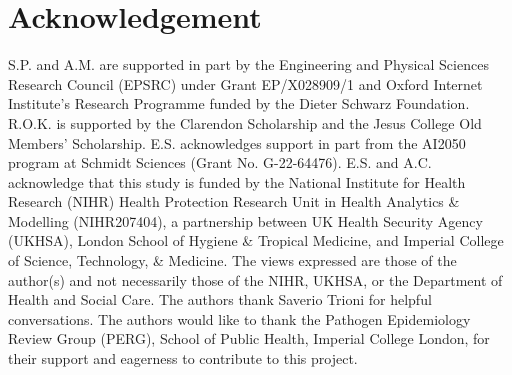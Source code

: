 \clearpage

\section*{Acknowledgement}
S.P. and A.M. are supported in part by the Engineering and Physical Sciences Research Council (EPSRC) under Grant EP/X028909/1 and Oxford Internet Institute’s Research Programme funded by the Dieter Schwarz Foundation. R.O.K. is supported by the Clarendon Scholarship and the Jesus College Old Members’ Scholarship. E.S. acknowledges support in part from the AI2050 program at Schmidt Sciences (Grant No. G-22-64476). E.S. and A.C. acknowledge that this study is funded by the National Institute for Health Research (NIHR) Health Protection Research Unit in Health Analytics \& Modelling (NIHR207404), a partnership between UK Health Security Agency (UKHSA), London School of Hygiene \& Tropical Medicine, and Imperial College of Science, Technology, \& Medicine. The views expressed are those of the author(s) and not necessarily those of the NIHR, UKHSA, or the Department of Health and Social Care. The authors thank Saverio Trioni for helpful conversations. The authors would like to thank the Pathogen Epidemiology Review Group (PERG), School of Public Health, Imperial College London, for their support and eagerness to contribute to this project.



